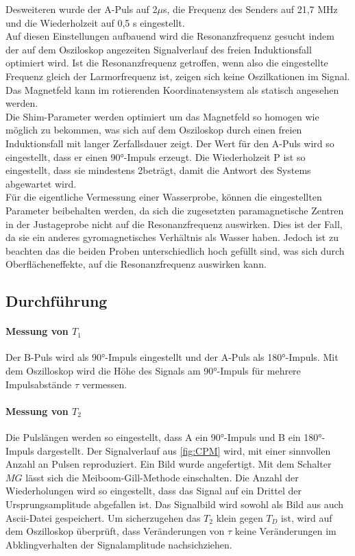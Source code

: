 Desweiteren wurde der A-Puls auf 2$\mu$s, die Frequenz des Senders auf 21,7 MHz und die
Wiederholzeit auf 0,5 s eingestellt.\\
Auf diesen Einstellungen aufbauend wird die Resonanzfrequenz gesucht indem
der auf dem Osziloskop angezeiten Signalverlauf des freien Induktionsfall optimiert
wird. Ist die Resonanzfrequenz getroffen, wenn also die eingestellte Frequenz gleich
der Larmorfrequenz ist, zeigen sich keine Oszilkationen im Signal. Das Magnetfeld
kann im rotierenden Koordinatensystem als statisch angesehen werden.\\
Die Shim-Parameter werden optimiert um das Magnetfeld so homogen wie möglich zu bekommen,
was sich auf dem Osziloskop durch einen freien Induktionsfall mit langer Zerfallsdauer
zeigt. Der Wert für den A-Puls wird so eingestellt, dass er einen 90°-Impuls
erzeugt. Die Wiederholzeit P  ist so eingestellt, dass sie mindestens 2\tau beträgt,
damit die Antwort des Systems abgewartet wird.\\
Für die eigentliche Vermessung einer Wasserprobe, können die eingestellten Parameter
beibehalten werden, da sich die zugesetzten paramagnetische Zentren in der
Justageprobe nicht auf die Resonanzfrequenz auswirken. Dies ist der Fall,
da sie ein anderes gyromagnetisches Verhältnis als Wasser haben. Jedoch ist
zu beachten das die beiden Proben unterschiedlich hoch gefüllt sind, was sich durch
Oberflächeneffekte, auf die Resonanzfrequenz auswirken kann.
\subsection{Durchführung}
\paragraph{Messung von $T_1$} Der B-Puls wird als 90°-Impuls eingestellt und
der A-Puls als 180°-Impuls. Mit dem Oszilloskop wird die Höhe des Signals am
90°-Impuls für mehrere Impulsabstände $\tau$ vermessen.
\paragraph{Messung von $T_2$}
Die Pulslängen werden so eingestellt, dass A ein 90°-Impuls und B ein 180°-Impuls
dargestellt. Der Signalverlauf aus \ref{fig:CPM} wird, mit einer sinnvollen
Anzahl an Pulsen reproduziert. Ein Bild wurde angefertigt.
Mit dem Schalter $MG$ lässt sich die Meiboom-Gill-Methode einschalten. Die Anzahl
der Wiederholungen wird so eingestellt, dass das Signal auf ein Drittel
der Ursprungsamplitude abgefallen ist. Das Signalbild wird
sowohl als Bild aus auch Ascii-Datei gespeichert. Um sicherzugehen
das $T_2$ klein gegen $T_D$ ist, wird auf dem Oszilloskop überprüft, dass Veränderungen
von $\tau$ keine Veränderungen im Abklingverhalten der Signalamplitude nachsichziehen.

